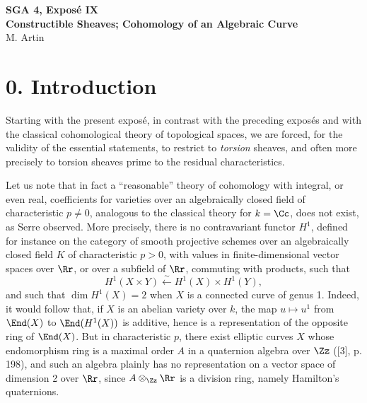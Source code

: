 
\begin{center}
{\Large \textbf{SGA 4, Expos\'e IX}}\\[0.35em]
{\large \textbf{Constructible Sheaves; Cohomology of an Algebraic Curve}}\\[0.25em]
{\normalsize M. Artin}
\end{center}

\bigskip

\section*{0. Introduction}

Starting with the present expos\'e, in contrast with the preceding expos\'es and with the classical cohomological theory of topological spaces, we are forced, for the validity of the essential statements, to restrict to \emph{torsion} sheaves, and often more precisely to torsion sheaves prime to the residual characteristics.

Let us note that in fact a ``reasonable'' theory of cohomology with integral, or even real, coefficients for varieties over an algebraically closed field of characteristic \(p\ne 0\), analogous to the classical theory for \(k=\Cc\), does not exist, as Serre observed. More precisely, there is no contravariant functor \(H^1\), defined for instance on the category of smooth projective schemes over an algebraically closed field \(K\) of characteristic \(p>0\), with values in finite-dimensional vector spaces over \(\Rr\), or over a subfield of \(\Rr\), commuting with products, \ie such that
\[
H^1(X\times Y)\xleftarrow{\sim}H^1(X)\times H^1(Y),
\]
and such that \(\dim H^1(X)=2\) when \(X\) is a connected curve of genus 1. Indeed, it would follow that, if \(X\) is an abelian variety over \(k\), the map \(u\mapsto u^1\) from \(\End(X)\) to \(\End(H^1(X))\) is additive, hence is a representation of the opposite ring of \(\End(X)\). But in characteristic \(p\), there exist elliptic curves \(X\) whose endomorphism ring is a maximal order \(A\) in a quaternion algebra over \(\Zz\) ([3], p. 198), and such an algebra plainly has no representation on a vector space of dimension 2 over \(\Rr\), since \(A\otimes_{\Zz}\Rr\) is a division ring, namely Hamilton's quaternions.

